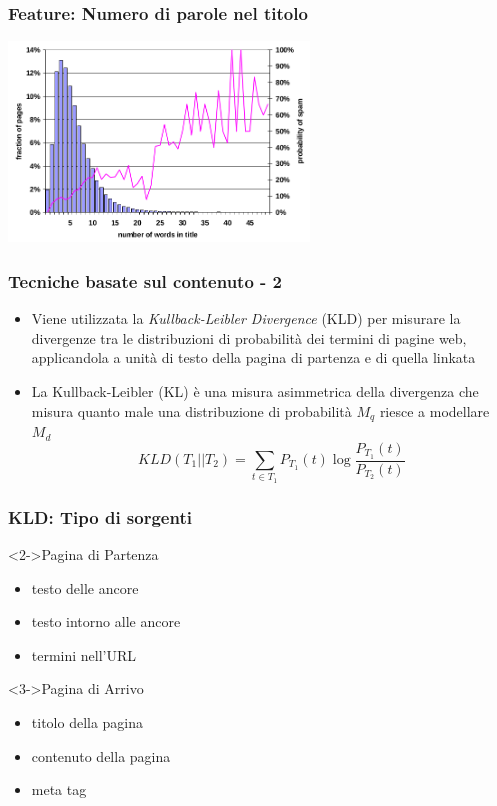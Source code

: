 \documentclass{beamer}
\begin{document}
\begin{frame}
 \frametitle{Feature: Numero di parole nel titolo}
  \begin{center}
  \includegraphics[width=8cm]{immagini/contenuto/fetterly4}
  \end{center}
\end{frame}
\begin{frame}
    \frametitle{Tecniche basate sul contenuto - 2}
    \begin{itemize}
     \item Viene utilizzata la \textit{Kullback-Leibler Divergence} (KLD) per misurare la divergenze tra le distribuzioni di probabilità dei termini	di pagine web, applicandola a unità di testo della pagina di partenza e di quella linkata
     \item La Kullback-Leibler (KL) è una misura  asimmetrica della divergenza che misura quanto male una distribuzione di probabilità \(M_q\) riesce a modellare \(M_d\)
     \begin{equation}
KLD(T_1||T_2) = \sum_{t \in T_1} P_{T_1}(t) \log \frac{P_{T_1}(t)}{P_{T_2}(t)}
\label{eqn:kld}
     \end{equation}
\end{itemize}
\end{frame}
\begin{frame}
  \frametitle{KLD: Tipo di sorgenti}
  \begin{block}<2->{Pagina di Partenza}
  \begin{itemize}
      \item testo delle ancore  
   \item testo intorno alle ancore
   \item termini nell'URL
  \end{itemize}
  \end{block}
  \begin{block}<3->{Pagina di Arrivo}
  \begin{itemize}
   \item titolo della pagina  
   \item contenuto della pagina
   \item meta tag
  \end{itemize}
  \end{block}
\end{frame}
\end{document}
